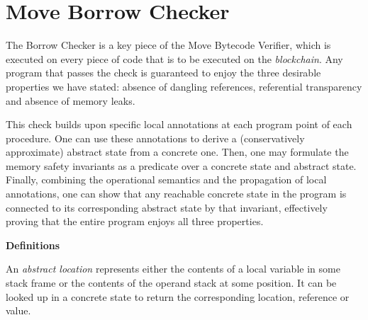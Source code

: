 \section{Move Borrow Checker}






The Borrow Checker is a key piece of the Move Bytecode Verifier, which is executed on every piece of code that is to be executed on the \textit{blockchain}.  Any program that passes the check is guaranteed to enjoy the three desirable properties we have stated: absence of dangling references, referential transparency and absence of memory leaks.

This check builds upon specific local annotations at each program point of each procedure. One can use these annotations to derive a (conservatively approximate) abstract state from a concrete one. Then, one may formulate the memory safety invariants as a predicate over a concrete state and abstract state. Finally, combining the operational semantics and the propagation of local annotations, one can show that any reachable concrete state in the program is connected to its corresponding abstract state by that invariant, effectively proving that the entire program enjoys all three properties.

\vspace{0.1cm}

\noindent\textbf{Definitions}

An \textit{abstract location} represents either the contents of a local variable in some stack frame or the contents of the operand stack at some position. It can be looked up in a concrete state to return the corresponding location, reference or value.

